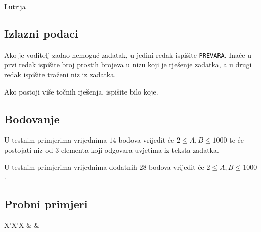 \begin{statement}[
  problempoints=70,
  timelimit=1 sekunda,
  memorylimit=512 MiB,
]{Lutrija}
\subsection*{Izlazni podaci}
Ako je voditelj zadao nemoguć zadatak, u jedini redak ispišite \texttt{PREVARA}.
Inače u prvi redak ispišite broj prostih brojeva u nizu koji je rješenje
zadatka, a u drugi redak ispišite traženi niz iz zadatka.

Ako postoji više točnih rješenja, ispišite bilo koje.

\subsection*{Bodovanje}
U testnim primjerima vrijednima $14$ bodova vrijedit će $2 \le A, B \le 1000$ te
će postojati niz od $3$ elementa koji odgovara uvjetima iz teksta zadatka.

U testnim primjerima vrijednima dodatnih $28$ bodova vrijedit će
$2 \le A, B \le 1000$.

\subsection*{Probni primjeri}
\begin{tabularx}{\textwidth}{X'X'X}
 &
 &
\end{tabularx}

\end{statement}

